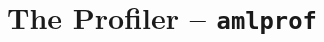 
\chapter[The Profiler -- amlprof]{The Profiler -- \lstinline!amlprof!}
\label{ch:tools-amlprof}








